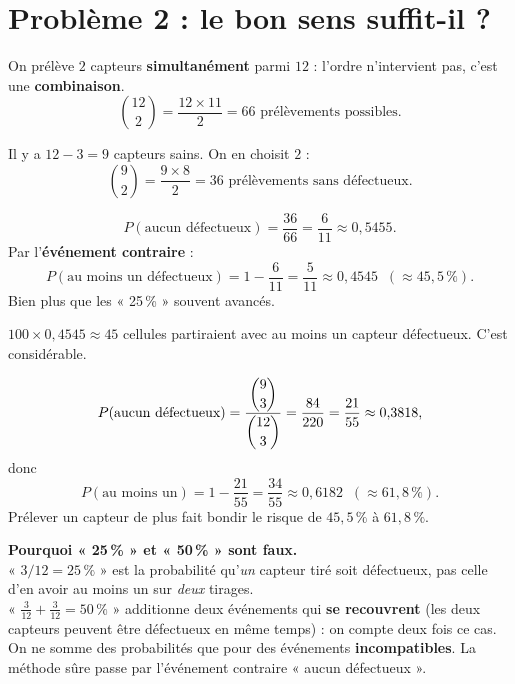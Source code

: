 \documentclass[a4paper,11pt]{article}
\begin{document}
\newpage
\section{Problème 2 : le bon sens suffit-il ?}

\begin{correction}
On prélève $2$ capteurs \textbf{simultanément} parmi $12$ : l'ordre n'intervient pas, c'est une \textbf{combinaison}.
\[
\binom{12}{2} = \frac{12\times 11}{2} = 66 \text{ prélèvements possibles.}
\]
\end{correction}

\begin{correction}
Il y a $12 - 3 = 9$ capteurs sains. On en choisit $2$ :
\[
\binom{9}{2} = \frac{9\times 8}{2} = 36 \text{ prélèvements sans défectueux.}
\]
\end{correction}

\begin{correction}
\[
P(\text{aucun défectueux}) = \frac{36}{66} = \frac{6}{11} \approx 0{,}5455.
\]
Par l'\textbf{événement contraire} :
\[
P(\text{au moins un défectueux}) = 1 - \frac{6}{11} = \frac{5}{11} \approx 0{,}4545 \;\; (\approx 45{,}5\,\%).
\]
Bien plus que les « 25\,\% » souvent avancés.
\end{correction}

\begin{correction}
$100 \times 0{,}4545 \approx 45$ cellules partiraient avec au moins un capteur défectueux. C'est considérable.
\end{correction}

\begin{correction}
\[
P(\text{aucun défectueux}) = \frac{\dbinom{9}{3}}{\dbinom{12}{3}} = \frac{84}{220} = \frac{21}{55} \approx 0{,}3818,
\]
donc
\[
P(\text{au moins un}) = 1 - \frac{21}{55} = \frac{34}{55} \approx 0{,}6182 \;\; (\approx 61{,}8\,\%).
\]
Prélever un capteur de plus fait bondir le risque de $45{,}5\,\%$ à $61{,}8\,\%$.
\end{correction}

\begin{piege}
\textbf{Pourquoi « 25\,\% » et « 50\,\% » sont faux.} \\
« $3/12 = 25\,\%$ » est la probabilité qu'\emph{un} capteur tiré soit défectueux, pas celle d'en avoir au moins un sur \emph{deux} tirages. \\
« $\frac{3}{12} + \frac{3}{12} = 50\,\%$ » additionne deux événements qui \textbf{se recouvrent} (les deux capteurs peuvent être défectueux en même temps) : on compte deux fois ce cas. On ne somme des probabilités que pour des événements \textbf{incompatibles}. La méthode sûre passe par l'événement contraire « aucun défectueux ».
\end{piege}
\end{document}

